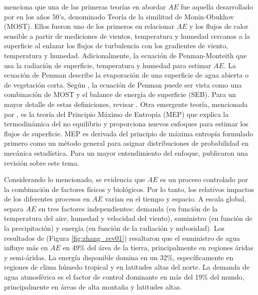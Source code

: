 \documentclass[12pt]{article}
\begin{document}

\thispagestyle{empty}

\citet{wang2012review} menciona que una de las primeras teorías en abordar $AE$ fue aquella desarrollado por \citet{monin1954basic} en los años 50's, denominado Teoría de la similitud de Monin-Obukhov (MOST). Ellos fueron uno de los primeros en relacionar $AE$ y los flujos de calor sensible a partir de mediciones de vientos, temperatura y humedad cercanos a la superficie al enlazar los flujos de turbulencia con los gradientes de viento, temperatura y humedad. Adicionalmente, la ecuación de Penman-Monteith \citep{penman1948natural,monteith1965evaporation} que usa la radiación de superficie, temperatura y humedad para estimar $AE$. La ecuación de Penman describe la evaporación de una superficie de agua abierta o de vegetación corta. Según \citet{wang2012review}, la ecuación de Penman puede ser vista como una combinación de MOST y el balance de energía de superficie (SEB). Para un mayor detalle de estas definiciones, revisar \citet{wang2012review}. Otra emergente teoría, mencionada por \citet{zhang2016review}, es la teoría del Principio Máximo de Entropía (MEP) que explica la termodinámica del no equilibrio y proporciona nuevos enfoques para estimar los flujos de superficie. MEP es derivada del principio de máxima entropía formulado primero como un método general para asignar distribuciones de probabilidad en mecánica estadística. Para un mayor entendimiento del enfoque, \citet{zhang2016review} publicaron una revisión sobre este tema.

Considerando lo mencionado, se evidencia que $AE$ es un proceso controlado por la combinación de factores físicos y biológicos. Por lo tanto, los relativos impactos de los diferentes procesos en $AE$ varían en el tiempo y espacio. A escala global, \citet{zhang2015vegetation} separa $AE$ en tres factores independientes: demanda (en función de la temperatura del aire, humedad y velocidad del viento), suministro (en función de la precipitación) y energía (en función de la radiación y nubosidad). Los resultados de \citet{zhang2015vegetation} (Figura \ref{fig:zhang_rev01}) resaltaron que el suministro de agua influye más en $AE$ en 49\% del área de la tierra, principalmente en regiones áridas y semi-áridas. La energía disponible domina en un 32\%, específicamente en regiones de clima húmedo tropical y en latitudes altas del norte. La demanda de agua atmosférica es el factor de control dominante en más del 19\% del mundo, principalmente en áreas de alta montaña y latitudes altas. 
\end{document}

